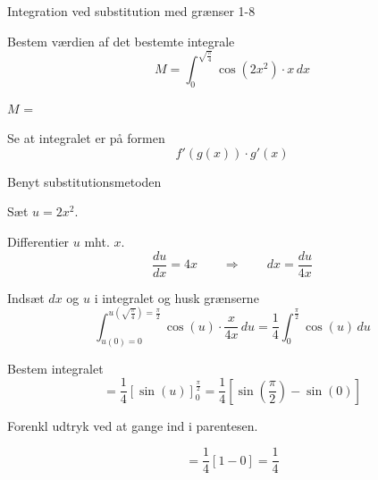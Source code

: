 \documentclass{article}
\begin{document}
\begin{exercise}{Integration ved substitution med grænser 1-8}


Bestem værdien af det bestemte integrale
\[
M = \int_0^{\sqrt{\frac{\pi}{4}}} \cos(2x^2) \cdot x \, dx
\]

$M$ = 



\hint

Se at integralet er på formen
\[
f'(g(x)) \cdot g'(x)
\]

\hint

Benyt substitutionsmetoden

\hint

Sæt $u=2x^2$.


\hint

Differentier $u$ mht. $x$.
\[
\frac{du}{dx} = 4x \qquad\Rightarrow \qquad dx = \frac{du}{4x}
\]

\hint

Indsæt $dx$ og $u$ i integralet og husk grænserne
\[
 \int_{u(0)=0}^{u\left(\sqrt{\frac{\pi}{4}}\right) = \frac{\pi}{2}} \cos(u) \cdot \frac{x}{4x} \, du = \frac{1}{4} \int_0^{\frac{\pi}{2}} \cos(u) \, du
\]

\hint

Bestem integralet
\[
= \frac{1}{4} \left[ \sin(u) \right]_0^{\frac{\pi}{2}} = \frac{1}{4} \left[ \sin\left(\frac{\pi}{2}\right) - \sin(0) \right]
\]

\hint
Forenkl udtryk ved at gange ind i parentesen.

\hint

\[
= \frac{1}{4} \left[ 1 - 0 \right] = \frac{1}{4}
\]


\end{exercise}
\end{document}

